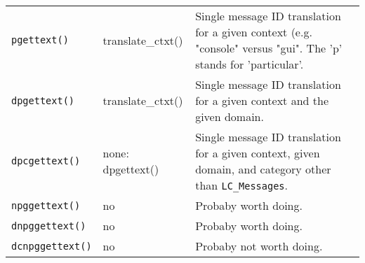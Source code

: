 \begin{table}[H]
{\begin{tabular}{l l p{7cm}}
         \texttt{pgettext()} & translate\_ctxt() &
            Single message ID translation for a given context (e.g.
            "console" versus "gui". The 'p' stands for 'particular'.\\

         \texttt{dpgettext()} & translate\_ctxt() &
            Single message ID translation for a given context and the
            given domain. \\

         \texttt{dpcgettext()} & none: dpgettext() &
            Single message ID translation for a given context,
            given domain, and category
            other than \texttt{LC\_Messages}. \\

         \texttt{npggettext()} & no &
            Probaby worth doing. \\

         \texttt{dnpggettext()} & no &
            Probaby worth doing. \\

         \texttt{dcnpggettext()} & no &
            Probaby not worth doing. \\

      \end{tabular}}
   \end{table}

